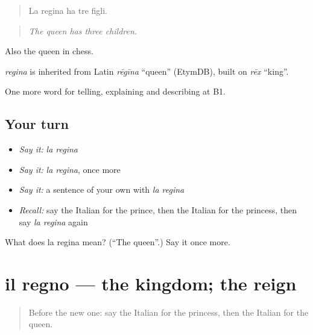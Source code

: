 \begin{quote}
La regina ha tre figli.
\end{quote}

\begin{quote}
\emph{The queen has three children.}
\end{quote}

Also the queen in chess.

\begin{cousinweb}
\emph{regina} is inherited from Latin \emph{rēgīna} \textquotedblleft{}queen\textquotedblright{} (EtymDB), built on \emph{rēx} \textquotedblleft{}king\textquotedblright{}.
\end{cousinweb}

\begin{grammarlens}[title={What you've built}]
One more word for telling, explaining and describing at B1.
\end{grammarlens}

\subsection*{Your turn}
\begin{itemize}
\raggedright
  \item \emph{Say it:} \emph{la regina}
  \item \emph{Say it:} \emph{la regina}, once more
  \item \emph{Say it:} a sentence of your own with \emph{la regina}
  \item \emph{Recall:} say the Italian for the prince, then the Italian for the princess, then say \emph{la regina} again
\end{itemize}

\begin{tcolorbox}[breakable,colback=teal!4,colframe=teal!35!black,title={Before you move on}]
What does la regina mean? (\textquotedblleft{}The queen\textquotedblright{}.) Say it once more.
\end{tcolorbox}
\section[il regno]{il regno — the kingdom; the reign}

\label{lesson:IT-C325-regno}



\begin{quote}
Before the new one: say the Italian for the princess, then the Italian for the queen.
\end{quote}

